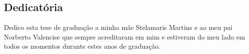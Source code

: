 




\clearpage
\begin{center}
\chapter*{Dedicatória}
\end{center}
\vspace*{1cm}

Dedico esta tese de graduação a minha mãe Stelamaris Martins e ao meu pai Norberto Valencise que sempre acreditaram em mim e estiveram do meu lado em todos os momentos durante estes anos de graduação.

